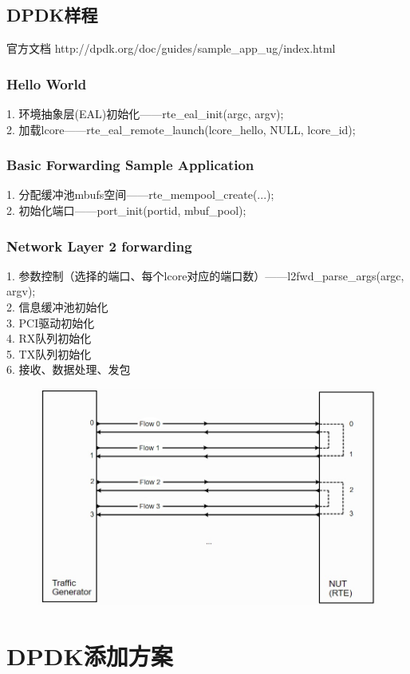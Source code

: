 \documentclass{article}
\begin{document}
\subsection{DPDK样程}
官方文档 http://dpdk.org/doc/guides/sample\_app\_ug/index.html
\subsubsection{Hello World}
1. 环境抽象层(EAL)初始化——rte\_eal\_init(argc, argv);\\
2. 加载lcore——rte\_eal\_remote\_launch(lcore\_hello, NULL, lcore\_id);\\
\subsubsection{Basic Forwarding Sample Application}
1. 分配缓冲池mbufs空间——rte\_mempool\_create(...);\\
2. 初始化端口——port\_init(portid, mbuf\_pool);\\
\subsubsection{Network Layer 2 forwarding}
1. 参数控制（选择的端口、每个lcore对应的端口数）——l2fwd\_parse\_args(argc, argv);\\
2. 信息缓冲池初始化\\
3. PCI驱动初始化\\
4. RX队列初始化\\
5. TX队列初始化\\
6. 接收、数据处理、发包\\
\begin{figure}[H]
	\centering
	\includegraphics[width = .8\textwidth]{frame_l2f.jpg}
\end{figure}

\section{DPDK添加方案}
\end{document}
